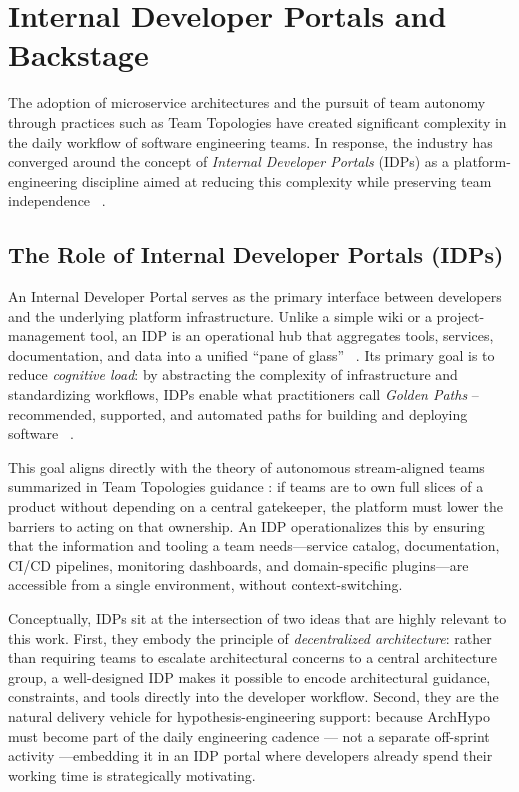\section{Internal Developer Portals and Backstage}
\label{sec:idp-backstage}

The adoption of microservice architectures and the pursuit of team autonomy through
practices such as Team Topologies have created significant complexity in the daily
workflow of software engineering teams. In response, the industry has converged around the
concept of \emph{Internal Developer Portals} (IDPs) as a platform-engineering
discipline aimed at reducing this complexity while preserving team
independence ~\citep{anjum2026idp}.

\subsection{The Role of Internal Developer Portals (IDPs)}
\label{subsec:idp-role}

An Internal Developer Portal serves as the primary interface between developers and the
underlying platform infrastructure. Unlike a simple wiki or a project-management tool,
an IDP is an operational hub that aggregates tools, services, documentation, and data
into a unified ``pane of glass'' ~\citep{anjum2026idp}. Its primary goal is to reduce
\emph{cognitive load}: by abstracting the complexity of infrastructure and standardizing
workflows, IDPs enable what practitioners call \emph{Golden Paths} -- recommended,
supported, and automated paths for building and deploying software ~\citep{anjum2026idp}.

This goal aligns directly with the theory of autonomous stream-aligned teams summarized in Team Topologies guidance \citep{skelton2019}: if teams are to own full slices of a product
without depending on a central gatekeeper, the platform must lower the barriers to
acting on that ownership. An IDP operationalizes this by ensuring that the information
and tooling a team needs—service catalog, documentation, CI/CD pipelines, monitoring
dashboards, and domain-specific plugins—are accessible from a single environment,
without context-switching.

Conceptually, IDPs sit at the intersection of two ideas that are highly relevant to this
work. First, they embody the principle of \emph{decentralized architecture}: rather
than requiring teams to escalate architectural concerns to a central architecture group,
a well-designed IDP makes it possible to encode architectural guidance, constraints, and
tools directly into the developer workflow. Second, they are the natural delivery vehicle
for hypothesis-engineering support: because ArchHypo must become part of the daily
engineering cadence --- not a separate off-sprint activity ---embedding it in an IDP portal where
developers already spend their working time is strategically motivating.

